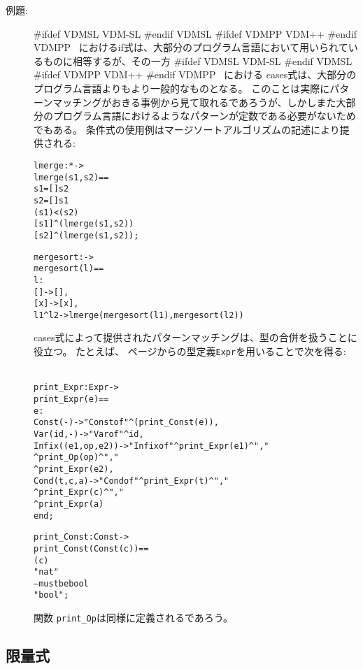 \documentclass[\pformat,12pt]{jarticle}
\newcommand{\vdmslpp}[2]{%
#ifdef VDMSL
#1
#endif VDMSL
#ifdef VDMPP
#2
#endif VDMPP
}
\newcommand{\vdmsl}{VDM-SL}
\newcommand{\vdmpp}{VDM++}
\begin{document}
\begin{description}
\item[例題:] 
 \vdmslpp{\vdmsl}{\vdmpp}\ におけるif式は、大部分のプログラム言語において用いられているものに相等するが、その一方 \vdmslpp{\vdmsl}{\vdmpp}\ における cases式は、大部分のプログラム言語よりもより一般的なものとなる。
このことは実際にパターンマッチングがおきる事例から見て取れるであろうが、しかしまた大部分のプログラム言語におけるようなパターンが定数である必要がないためでもある。
  条件式の使用例はマージソートアルゴリズムの記述により提供される:
  \begin{alltt}
  lmerge :  *  -> 
  lmerge (s1,s2) ==
     s1 = []  s2
     s2 = []  s1
     ( s1) < ( s2)
     [ s1]\verb+^+(lmerge ( s1, s2))
     [ s2]\verb+^+(lmerge (s1,  s2));

  mergesort :  -> 
  mergesort (l) ==
     l:
      [] -> [],
      [x] -> [x],
      l1\verb+^+l2 -> lmerge (mergesort(l1), mergesort(l2))
  \end{alltt}
cases式によって提供されたパターンマッチングは、型の合併を扱うことに役立つ。
たとえば、\pageref{exprdef} ページからの型定義\texttt{Expr}を用いることで次を得る:
  \begin{alltt}\label{printExprDef}
  print_Expr : Expr -> 
  print_Expr (e) ==
     e:
      Const(-) -> "Const of"\verb+^+(print_Const(e)),
      Var(id,-) -> "Var of"\verb+^+id,
      Infix((e1,op,e2)) -> "Infix of"\verb+^+print_Expr(e1)^","
                                      \verb+^+print_Op(op)\verb+^+","
                                      \verb+^+print_Expr(e2),
      Cond(t,c,a) -> "Cond of"\verb+^+print_Expr(t)\verb+^+","
                                 \verb+^+print_Expr(c)\verb+^+","
                                 \verb+^+print_Expr(a)
    end;

  print_Const : Const -> 
  print_Const(Const(c)) ==
     (c)
     "nat"
     -- must be bool
         "bool";
  \end{alltt}
  関数 \texttt{print\_Op}は同様に定義されるであろう。
\end{description}

\subsection{限量式}
\end{document}
